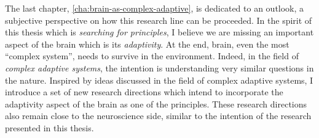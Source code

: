 The last chapter, \autoref{cha:brain-as-complex-adaptive}, is dedicated to an outlook, a subjective perspective on how this research line can be proceeded.
In the spirit of this thesis which is \emph{searching for principles},
I believe we are missing an important aspect of the brain which is its \emph{adaptivity}.
At the end, brain, even the most ``complex system'', needs to survive in the environment.
Indeed, in the field of \emph{complex adaptive systems}, the intention is understanding very similar 
questions in the nature.
Inspired by ideas discussed in the field of complex adaptive systems,
I introduce a set of new research directions which intend to  incorporate the adaptivity aspect of the brain as one of the principles. 
These research directions also remain close to the neuroscience side, similar to the intention of the research presented in this thesis.



\endgroup			

\vfill




